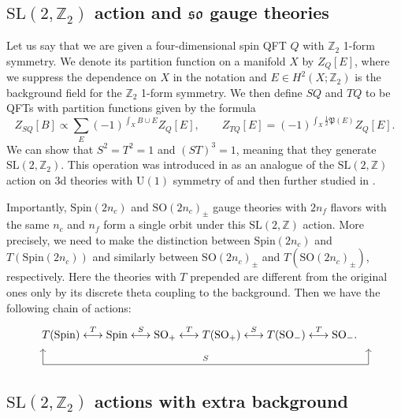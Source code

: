 \documentclass[12pt]{article}
\numberwithin{equation}{section}
\def\bZ{\mathbb{Z}}
\def\fP{\mathfrak{P}}
\def\U{\mathrm{U}}
\def\SO{\mathrm{SO}}
\def\so{\mathfrak{so}}
\def\Spin{\mathrm{Spin}}
\def\SL{\mathrm{SL}}
\begin{document}
\subsection{$\SL(2,\bZ_2)$ action and $\so$ gauge theories}

Let us say that we are given a four-dimensional spin QFT $Q$ with $\bZ_2$ 1-form symmetry.
We denote its partition function on a manifold $X$ by $Z_Q[E]$, 
where we suppress the dependence on $X$ in the notation and $E\in H^2(X;\bZ_2)$ is the background field for the $\bZ_2$ 1-form symmetry.
We then define $SQ$ and $TQ$ to be QFTs with partition functions given by the formula \begin{equation}
Z_{SQ}[B] \propto \sum_{E} (-1)^{\int_X B\cup E} Z_Q[E],\qquad
Z_{TQ}[E]= (-1)^{\int_X \tfrac12 \fP(E)} Z_Q[E].
\end{equation}
We can show that $S^2=T^2=1$ and $(ST)^3=1$, meaning that they generate $\SL(2,\bZ_2)$.
This operation was introduced in  \cite{Gaiotto:2014kfa} as an analogue of the $\SL(2,\bZ)$ action on 3d theories with $\U(1)$ symmetry of  \cite{Witten:2003ya} and then further studied in \cite{Bhardwaj:2020ymp}.


Importantly, $\Spin(2n_c)$ and $\SO(2n_c)_\pm$  gauge theories with $2n_f$ flavors with the same $n_c$ and $n_f$ form a single orbit under this $\SL(2,\bZ)$ action.
More precisely, we need to make the distinction between $\Spin(2n_c)$ and $T(\Spin(2n_c))$ and  similarly between $\SO(2n_c)_\pm$ and $T(\SO(2n_c)_\pm)$, respectively.
Here the theories with $T$ prepended are different from the original ones only by its discrete theta coupling to the background.
Then we have the following chain of actions: \begin{equation}
\begin{tikzpicture}
	\node at (0,0) {$
		T(\Spin) \stackrel{T}{\longleftrightarrow} 
		\Spin \stackrel{S}{\longleftrightarrow} 
		\SO_+ \stackrel{T}{\longleftrightarrow} 
		T(\SO_+) \stackrel{S}{\longleftrightarrow} 
		T(\SO_-) \stackrel{T}{\longleftrightarrow} 
		\SO_-.
	$};
	\draw[->] (-5,-1) -- (-5,-0.5);
	\draw[->] (5.4,-1) -- (5.4,-0.5);
	\draw (-5,-1) -- node[above] {\scriptsize $S$} (5.4,-1);
\end{tikzpicture}
\label{sl2z-on-so}
\end{equation}

\subsection{$\SL(2,\bZ_2)$ actions with extra background}
\end{document}
